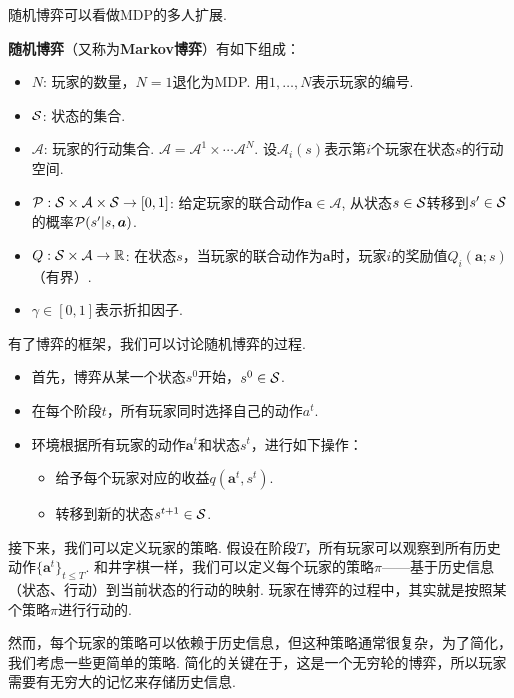 随机博弈可以看做MDP的多人扩展. 

\begin{definition}
\textbf{随机博弈}（又称为\textbf{Markov博弈}）有如下组成：
\begin{itemize}
\item $N$: 玩家的数量，$N=1$退化为MDP. 用$1,\dots,N$表示玩家的编号.
\item $\mathcal S$: 状态的集合.
\item $\mathcal A$: 玩家的行动集合. $\mathcal A=\mathcal A^1\times \cdots\mathcal A^N$. 设$\mathcal A_i(s)$表示第$i$个玩家在状态$s$的行动空间.
\item $\mathcal P: \mathcal S\times \mathcal A\times \mathcal S\to [0,1]$: 给定玩家的联合动作$\boldsymbol a\in\mathcal A$, 从状态$s\in \mathcal S$转移到$s'\in \mathcal S$的概率$\mathcal P(s'|s,\boldsymbol a)$.
\item $Q: \mathcal S\times \mathcal A\to \mathbb{R}$: 在状态$s$，当玩家的联合动作为$\boldsymbol a$时，玩家$i$的奖励值$Q_i(\boldsymbol a;s)$（有界）.
\item $\gamma\in[0,1]$表示折扣因子.
\end{itemize}
\end{definition}

有了博弈的框架，我们可以讨论随机博弈的过程. 
\begin{itemize}
    \item 首先，博弈从某一个状态$s^0$开始，$s^0\in \mathcal S$.
    \item 在每个阶段$t$，所有玩家同时选择自己的动作$a^t$.
    \item 环境根据所有玩家的动作$\boldsymbol a^t$和状态$s^t$，进行如下操作：
    \begin{itemize}
        \item 给予每个玩家对应的收益$q(\boldsymbol a^t, s^t)$.
        \item 转移到新的状态$s^{t+1}\in \mathcal S$.
    \end{itemize}
\end{itemize}
    
接下来，我们可以定义玩家的策略. 假设在阶段$T$，所有玩家可以观察到所有历史动作$\{\boldsymbol a^t\}_{t\leq T}$. 和井字棋一样，我们可以定义每个玩家的策略$\pi$——基于历史信息（状态、行动）到当前状态的行动的映射. 玩家在博弈的过程中，其实就是按照某个策略$\pi$进行行动的. 

然而，每个玩家的策略可以依赖于历史信息，但这种策略通常很复杂，为了简化，我们考虑一些更简单的策略. 简化的关键在于，这是一个无穷轮的博弈，所以玩家需要有无穷大的记忆来存储历史信息. 

